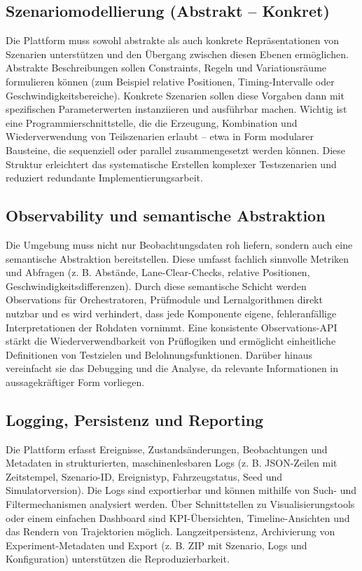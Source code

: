 \subsection{Szenariomodellierung (Abstrakt – Konkret)}

Die Plattform muss sowohl abstrakte als auch konkrete Repräsentationen von Szenarien unterstützen und den Übergang zwischen diesen Ebenen ermöglichen. Abstrakte Beschreibungen sollen Constraints, Regeln und Variationsräume formulieren können (zum Beispiel relative Positionen, Timing-Intervalle oder Geschwindigkeitsbereiche). Konkrete Szenarien sollen diese Vorgaben dann mit spezifischen Parameterwerten instanziieren und ausführbar machen. Wichtig ist eine Programmierschnittstelle, die die Erzeugung, Kombination und Wiederverwendung von Teilszenarien erlaubt – etwa in Form modularer Bausteine, die sequenziell oder parallel zusammengesetzt werden können. Diese Struktur erleichtert das systematische Erstellen komplexer Testszenarien und reduziert redundante Implementierungsarbeit.

\subsection{Observability und semantische Abstraktion}

Die Umgebung muss nicht nur Beobachtungsdaten roh liefern, sondern auch eine semantische Abstraktion bereitstellen. Diese umfasst fachlich sinnvolle Metriken und Abfragen (z. B. Abstände, Lane-Clear-Checks, relative Positionen, Geschwindigkeitsdifferenzen). Durch diese semantische Schicht werden Observations für Orchestratoren, Prüfmodule und Lernalgorithmen direkt nutzbar und es wird verhindert, dass jede Komponente eigene, fehleranfällige Interpretationen der Rohdaten vornimmt. Eine konsistente Observations-API stärkt die Wiederverwendbarkeit von Prüflogiken und ermöglicht einheitliche Definitionen von Testzielen und Belohnungsfunktionen. Darüber hinaus vereinfacht sie das Debugging und die Analyse, da relevante Informationen in aussagekräftiger Form vorliegen.

\subsection{Logging, Persistenz und Reporting}

Die Plattform erfasst Ereignisse, Zustandsänderungen, Beobachtungen und Metadaten in strukturierten, maschinenlesbaren Logs (z. B. JSON-Zeilen mit Zeitstempel, Szenario-ID, Ereignistyp, Fahrzeugstatus, Seed und Simulatorversion). Die Logs sind exportierbar und können mithilfe von Such- und Filtermechanismen analysiert werden. Über Schnittstellen zu Visualisierungstools oder einem einfachen Dashboard sind KPI-Übersichten, Timeline-Ansichten und das Rendern von Trajektorien möglich. Langzeitpersistenz, Archivierung von Experiment-Metadaten und Export (z. B. ZIP mit Szenario, Logs und Konfiguration) unterstützen die Reproduzierbarkeit.

